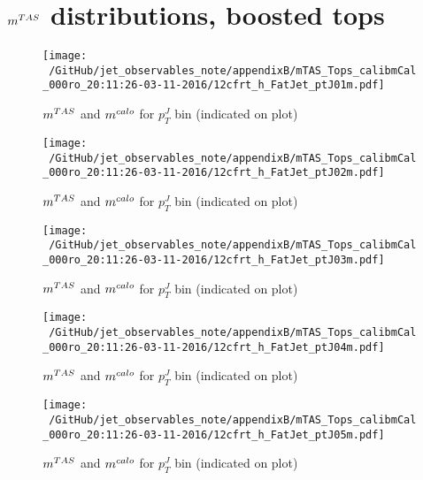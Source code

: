 \clearpage
\onecolumn
\vspace*{\fill}
\section{$m^{TAS}$  distributions, boosted tops}
\vfill
\clearpage
\twocolumn

\begin{figure}
 
\texttt{[image: ~/GitHub/jet\_observables\_note/appendixB/mTAS\_Tops\_calibmCal\_000ro\_20:11:26-03-11-2016/12cfrt\_h\_FatJet\_ptJ01m.pdf]}
\caption{$m^{TAS}$ and $m^{calo}$ for $p_{T}^{J}$ bin (indicated on plot) }
 
\end{figure}
 
\begin{figure}
 
\texttt{[image: ~/GitHub/jet\_observables\_note/appendixB/mTAS\_Tops\_calibmCal\_000ro\_20:11:26-03-11-2016/12cfrt\_h\_FatJet\_ptJ02m.pdf]}
\caption{$m^{TAS}$ and $m^{calo}$ for $p_{T}^{J}$ bin (indicated on plot) }
 
\end{figure}
 
\begin{figure}
 
\texttt{[image: ~/GitHub/jet\_observables\_note/appendixB/mTAS\_Tops\_calibmCal\_000ro\_20:11:26-03-11-2016/12cfrt\_h\_FatJet\_ptJ03m.pdf]}
\caption{$m^{TAS}$ and $m^{calo}$ for $p_{T}^{J}$ bin (indicated on plot) }
 
\end{figure}
 
\begin{figure}
 
\texttt{[image: ~/GitHub/jet\_observables\_note/appendixB/mTAS\_Tops\_calibmCal\_000ro\_20:11:26-03-11-2016/12cfrt\_h\_FatJet\_ptJ04m.pdf]}
\caption{$m^{TAS}$ and $m^{calo}$ for $p_{T}^{J}$ bin (indicated on plot) }
 
\end{figure}
 
\begin{figure}
 
\texttt{[image: ~/GitHub/jet\_observables\_note/appendixB/mTAS\_Tops\_calibmCal\_000ro\_20:11:26-03-11-2016/12cfrt\_h\_FatJet\_ptJ05m.pdf]}
\caption{$m^{TAS}$ and $m^{calo}$ for $p_{T}^{J}$ bin (indicated on plot) }
 
\end{figure}
 
